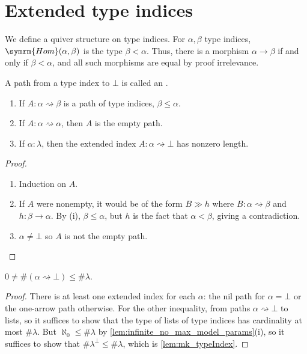 \section{Extended type indices}

\begin{definition}
    We define a quiver structure on type indices.
    For \( \alpha, \beta \) type indices, \( \symrm{Hom}(\alpha, \beta) \) is the type \( \beta < \alpha \).
    Thus, there is a morphism \( \alpha \to \beta \) if and only if \( \beta < \alpha \), and all such morphisms are equal by proof irrelevance.
\end{definition}
\begin{definition}
    A path from a type index to \( \bot \) is called an .
\end{definition}
\begin{lemma}
    \label{lem:path_props}
    \begin{enumerate}
        \item If \( A : \alpha \rightsquigarrow \beta \) is a path of type indices, \( \beta \leq \alpha \).
        \item If \( A : \alpha \rightsquigarrow \alpha \), then \( A \) is the empty path.
        \item If \( \alpha : \lambda \), then the extended index \( A : \alpha \rightsquigarrow \bot \) has nonzero length.
    \end{enumerate}
\end{lemma}
\begin{proof}
    \begin{enumerate}
        \item Induction on \( A \).
        \item If \( A \) were nonempty, it would be of the form \( B \gg h \) where \( B : \alpha \rightsquigarrow \beta \) and \( h : \beta \to \alpha \).
        By (i), \( \beta \leq \alpha \), but \( h \) is the fact that \( \alpha < \beta \), giving a contradiction.
        \item \( \alpha \neq \bot \) so \( A \) is not the empty path.
    \end{enumerate}
\end{proof}
\begin{lemma}
    \label{lem:mk_extendedIndex}
    \( 0 \neq \#(\alpha \rightsquigarrow \bot) \leq \#\lambda \).
\end{lemma}
\begin{proof}
    There is at least one extended index for each \( \alpha \): the nil path for \( \alpha = \bot \) or the one-arrow path otherwise.
    For the other inequality,  from paths \( \alpha \rightsquigarrow \bot \) to lists, so it suffices to show that the type of lists of type indices has cardinality at most \( \#\lambda \).
    But \( \aleph_0 \leq \#\lambda \) by \ref{lem:infinite_no_max_model_params}(i), so it suffices to show that \( \#\lambda^\bot \leq \#\lambda \), which is \ref{lem:mk_typeIndex}.
\end{proof}
